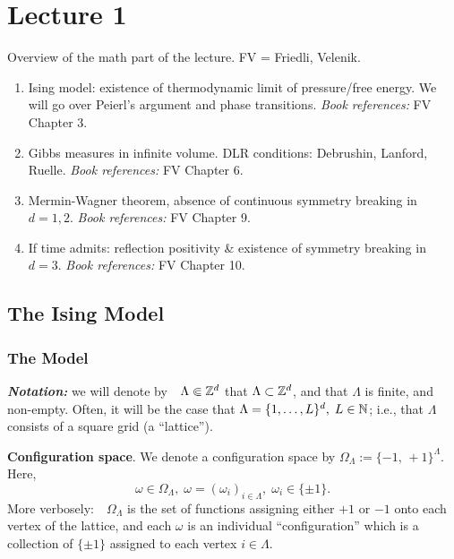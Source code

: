 \documentclass{article}
\begin{document}
\section{Lecture 1}
\label{sec:lecture1}

Overview of the math part of the lecture. FV = Friedli, Velenik.

\begin{enumerate}
\item Ising model: existence of thermodynamic limit of pressure/free energy. We will go over Peierl's argument and phase transitions. \textit{Book references:} FV Chapter 3.
\item Gibbs measures in infinite volume. DLR conditions: Debrushin, Lanford, Ruelle. \textit{Book references:} FV Chapter 6.
\item Mermin-Wagner theorem, absence of continuous symmetry breaking in $d = 1, 2$. \textit{Book references:} FV Chapter 9.
\item If time admits: reflection positivity \& existence of symmetry breaking in $d = 3$. \textit{Book references:} FV Chapter 10.
\end{enumerate}

\subsection{The Ising Model}
\label{sec:ising_model}

\subsubsection{The Model}

\textbf{\textit{Notation:}} we will denote by~\index{$\Lambda$}~$\Lambda \Subset \mathbb{Z}^d$ that $\Lambda \subset \mathbb{Z}^d$, and that $\Lambda$ is finite, and non-empty. Often, it will be the case that $\Lambda = \{ 1 , \dots , L \}^d, \; L \in \mathbb{N}$; i.e., that $\Lambda$ consists of a square grid (a ``lattice'').

\textbf{Configuration space}. We denote a configuration space by $\Omega_{\Lambda} := \{ -1, \, +1 \}^{\Lambda}$. Here,
\begin{equation}
  \omega \in \Omega_{\Lambda}, \; \omega = (\omega_i)_{i \in\Lambda}, \; \omega_i\in \{ \pm 1\}.
\end{equation}
More verbosely:~\index{$\Omega_{\Lambda}$}~$\Omega_{\Lambda}$ is the set of functions assigning either $+1$ or $-1$ onto each vertex of the lattice, and each $\omega$ is an individual ``configuration'' which is a collection of $\{ \pm 1 \}$ assigned to each vertex $i \in \Lambda$.
\end{document}
